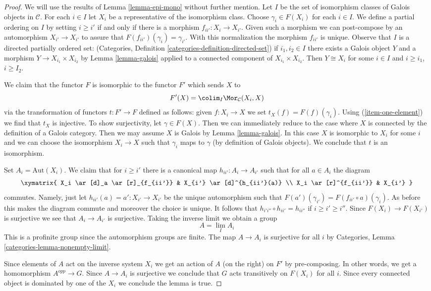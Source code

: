 \begin{proof}
We will use the results of Lemma \ref{lemma-epi-mono} without further mention.
Let $I$ be the set of isomorphism classes of Galois objects in $\mathcal{C}$.
For each $i \in I$ let $X_i$ be a representative of the isomorphism class.
Choose $\gamma_i \in F(X_i)$ for each $i \in I$.
We define a partial ordering on $I$ by setting $i \geq i'$ if
and only if there is a morphism $f_{ii'} : X_i \to X_{i'}$.
Given such a morphism we can post-compose by an automorphism
$X_{i'} \to X_{i'}$ to assure that $F(f_{ii'})(\gamma_i) = \gamma_{i'}$.
With this normalization the morphism $f_{ii'}$ is unique.
Observe that $I$ is a directed partially ordered set:
(Categories, Definition \ref{categories-definition-directed-set})
if $i_1, i_2 \in I$ there exists a Galois object $Y$ and a morphism
$Y \to X_{i_1} \times X_{i_2}$ by Lemma \ref{lemma-galois} applied
to a connected component of $X_{i_1} \times X_{i_2}$.
Then $Y \cong X_i$ for some $i \in I$ and $i \geq i_1$, $i \geq I_2$.

\medskip\noindent
We claim that the functor $F$ is isomorphic to the functor $F'$
which sends $X$ to
$$
F'(X) = \colim_I \Mor_\mathcal{C}(X_i, X)
$$
via the transformation of functors $t : F' \to F$ defined as follows:
given $f : X_i \to X$ we set $t_X(f) = F(f)(\gamma_i)$.
Using (\ref{item-one-element}) we find that $t_X$ is injective.
To show surjectivity, let $\gamma \in F(X)$. Then we can immediately
reduce to the case where $X$ is connected by the definition of
a Galois category. Then we may assume $X$ is Galois by
Lemma \ref{lemma-galois}. In this case $X$ is isomorphic to $X_i$
for some $i$ and we can choose the isomorphism $X_i \to X$ such
that $\gamma_i$ maps to $\gamma$ (by definition of Galois objects).
We conclude that $t$ is an isomorphism.

\medskip\noindent
Set $A_i = \text{Aut}(X_i)$.
We claim that for $i \geq i'$ there is a canonical map
$h_{ii'} : A_i \to A_{i'}$ such that for all $a \in A_i$
the diagram
$$
\xymatrix{
X_i \ar[d]_a \ar[r]_{f_{ii'}} & X_{i'} \ar[d]^{h_{ii'}(a)} \\
X_i \ar[r]^{f_{ii'}} & X_{i'}
}
$$
commutes. Namely, just let $h_{ii'}(a) = a' : X_{i'} \to X_{i'}$
be the unique automorphism such that
$F(a')(\gamma_{i'}) = F(f_{ii'} \circ a)(\gamma_i)$.
As before this makes the diagram commute and moreover the choice
is unique.
It follows that
$h_{i'i''} \circ h_{ii'} = h_{ii''}$
if $i \geq i' \geq i''$.
Since $F(X_i) \to F(X_{i'})$ is surjective we see that
$A_i \to A_{i'}$ is surjective.
Taking the inverse limit we obtain a group
$$
A = \lim_I A_i
$$
This is a profinite group since the automorphism groups are finite.
The map $A \to A_i$ is surjective for all $i$ by
Categories, Lemma \ref{categories-lemma-nonempty-limit}.

\medskip\noindent
Since elements of $A$ act on the inverse system $X_i$ we get an action of
$A$ (on the right) on $F'$ by pre-composing. In other words, we get
a homomorphism $A^{opp} \to G$. Since $A \to A_i$ is surjective we conclude
that $G$ acts transitively on $F(X_i)$ for all $i$. Since every connected
object is dominated by one of the $X_i$ we conclude the lemma is true.
\end{proof}


